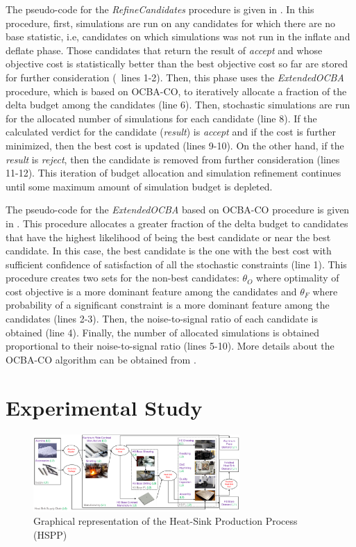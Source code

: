 \documentclass[a4paper, 12pt]{article} %
\begin{document}
The pseudo-code for the \textit{RefineCandidates} procedure is given in \algoRefineCand. 
In this procedure, first, simulations are run on any candidates for which there are no base statistic, i.e, candidates on which simulations was not run in the inflate and deflate phase. Those candidates that return the result of \textit{accept} and whose objective cost is statistically better than the best objective cost so far are stored for further consideration (\algoRefineCand~lines 1-2).
Then, this phase uses the \textit{ExtendedOCBA} procedure, which is based on OCBA-CO, to iteratively allocate a fraction of the delta budget among the candidates (line 6).
Then, stochastic simulations are run for the allocated number of simulations for each candidate (line 8).
If the calculated verdict for the candidate (\textit{result}) is \textit{accept} and if the cost is further minimized, then the best cost is updated (lines 9-10).
On the other hand, if the \textit{result} is \textit{reject}, then the candidate is removed from further consideration (lines 11-12).
This iteration of budget allocation and simulation refinement continues until some maximum amount of simulation budget is depleted.

The pseudo-code for the \textit{ExtendedOCBA} based on OCBA-CO procedure is given in \algoExOCBA.
This procedure allocates a greater fraction of the delta budget to candidates that have the highest likelihood of being the best candidate or near the best candidate. 
In this case, the best candidate is the one with the best cost with sufficient confidence of satisfaction of all the stochastic constraints (line 1).
This procedure creates two sets for the non-best candidates: $\theta_O$ where optimality of cost objective is a more dominant feature among the candidates and $\theta_F$ where probability of a significant constraint is a more dominant feature among the candidates (lines 2-3). 
Then, the noise-to-signal ratio of each candidate is obtained (line 4).
Finally, the number of allocated simulations is obtained proportional to their noise-to-signal ratio (lines 5-10). 
More details about the OCBA-CO algorithm can be obtained from \cite{Lee2012OCBACO}.

\section{Experimental Study}
\label{sec:expResults}

\begin{figure}[b]
	\begin{center}
		\includegraphics[width=0.7\textwidth]{images/HeatSink_contractSN.pdf}
		\caption{Graphical representation of the Heat-Sink Production Process (HSPP)}
		\label{fig:heatsinkSC}       %
	\end{center}
\end{figure}
\end{document}
